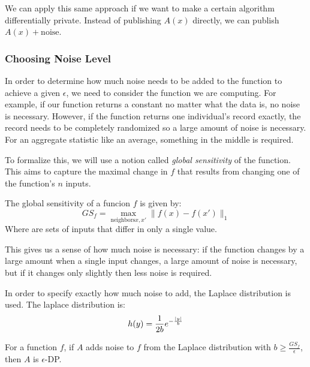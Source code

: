 We can apply this same approach if we want to make a certain algorithm differentially private. Instead of publishing $A(x)$ directly, we can publish $A(x) + \text{noise}$.

\subsubsection{Choosing Noise Level}
In order to determine how much noise needs to be added to the function to achieve a given $\epsilon$, we need to consider the function we are computing. For example, if our function returns a constant no matter what the data is, no noise is necessary. However, if the function returns one individual's record exactly, the record needs to be completely randomized so a large amount of noise is necessary. For an aggregate statistic like an average, something in the middle is required. 

To formalize this, we will use a notion called \emph{global sensitivity} of the function. This aims to capture the maximal change in $f$ that results from changing one of the function's $n$ inputs.

\begin{definition}
	The global sensitivity of a funcion $f$ is given by:
	\[ GS_f = \max_{\text{neighbors} x, x'} \| f(x) - f(x') \|_1 \]
	Where  are sets of inputs that differ in only a single value.
\end{definition}

This gives us a sense of how much noise is necessary: if the function changes by a large amount when a single input changes, a large amount of noise is necessary, but if it changes only slightly then less noise is required.

In order to specify exactly how much noise to add, the Laplace distribution is used. The laplace distribution is:
\[ h(y) = \frac{1}{2b} e^{-\frac{\left| y \right|}{b}} \]

For a function $f$, if $A$ adds noise to $f$ from the Laplace distribution with $b \geq \frac{GS_f}{\epsilon}$, then $A$ is $\epsilon$-DP.



